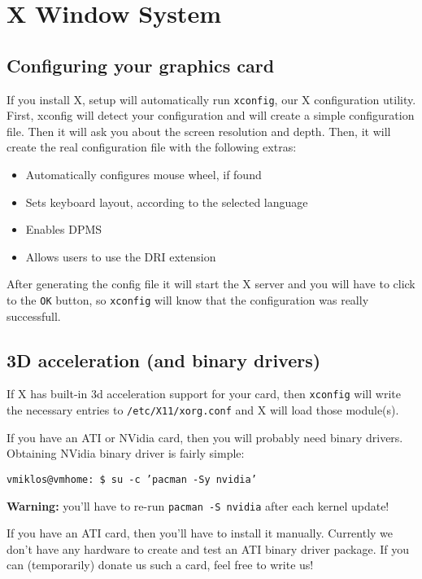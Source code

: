 \chapter{X Window System}

\section{Configuring your graphics card}
\label{section:xconfig}

If you install X, setup will automatically run {\tt xconfig}, our X configuration utility. First, xconfig will detect your configuration and will create a simple configuration file. Then it will ask you about the screen resolution and depth. Then, it will create the real configuration file with the following extras:

\begin{itemize}
\item Automatically configures mouse wheel, if found
\item Sets keyboard layout, according to the selected language
\item Enables DPMS
\item Allows users to use the DRI extension
\end{itemize}

After generating the config file it will start the X server and you will have to click to the {\tt OK} button, so {\tt xconfig} will know that the configuration was really successfull.

\section{3D acceleration (and binary drivers)}

If X has built-in 3d acceleration support for your card, then {\tt xconfig} will write the necessary entries to {\tt /etc/X11/xorg.conf} and X will load those module(s). 

If you have an ATI or NVidia card, then you will probably need binary drivers. Obtaining NVidia binary driver is fairly simple:

{\tt vmiklos@vmhome:~\$ su -c 'pacman -Sy nvidia'}

\textbf{Warning:} you'll have to re-run {\tt pacman -S nvidia} after each kernel update!

If you have an ATI card, then you'll have to install it manually. Currently we don't have any hardware to create and test an ATI binary driver package. If you can (temporarily) donate us such a card, feel free to write us!
